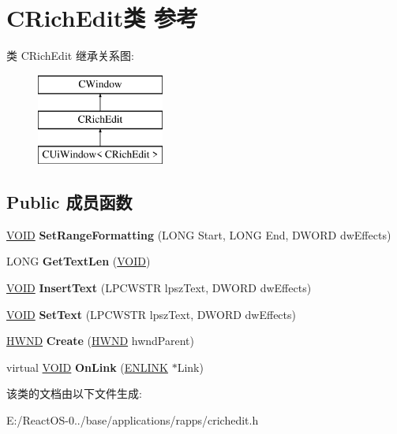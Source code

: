\hypertarget{class_c_rich_edit}{}\section{C\+Rich\+Edit类 参考}
\label{class_c_rich_edit}
类 C\+Rich\+Edit 继承关系图\+:\begin{figure}[H]
\begin{center}
\leavevmode
\includegraphics[height=3.000000cm]{class_c_rich_edit}
\end{center}
\end{figure}
\subsection*{Public 成员函数}
\begin{DoxyCompactItemize}
\item 
\mbox{\label{class_c_rich_edit_af2c594a76f5c8481ec339afa2b800c7c}} 
\hyperlink{interfacevoid}{V\+O\+ID} {\bfseries Set\+Range\+Formatting} (L\+O\+NG Start, L\+O\+NG End, D\+W\+O\+RD dw\+Effects)
\item 
\mbox{\label{class_c_rich_edit_a51ebb35332644a5d17b8f1415855b50b}} 
L\+O\+NG {\bfseries Get\+Text\+Len} (\hyperlink{interfacevoid}{V\+O\+ID})
\item 
\mbox{\label{class_c_rich_edit_ad73cb7354f953c31e63ad409e54b90bf}} 
\hyperlink{interfacevoid}{V\+O\+ID} {\bfseries Insert\+Text} (L\+P\+C\+W\+S\+TR lpsz\+Text, D\+W\+O\+RD dw\+Effects)
\item 
\mbox{\label{class_c_rich_edit_afa9e1a014ae86b61a00fd5e3c3162b8d}} 
\hyperlink{interfacevoid}{V\+O\+ID} {\bfseries Set\+Text} (L\+P\+C\+W\+S\+TR lpsz\+Text, D\+W\+O\+RD dw\+Effects)
\item 
\mbox{\label{class_c_rich_edit_aa7c04e2b4a3f94313a43da38326c8c56}} 
\hyperlink{interfacevoid}{H\+W\+ND} {\bfseries Create} (\hyperlink{interfacevoid}{H\+W\+ND} hwnd\+Parent)
\item 
\mbox{\label{class_c_rich_edit_a33022ef7685f775c39dcf25ee1142592}} 
virtual \hyperlink{interfacevoid}{V\+O\+ID} {\bfseries On\+Link} (\hyperlink{struct__enlink}{E\+N\+L\+I\+NK} $\ast$Link)
\end{DoxyCompactItemize}


该类的文档由以下文件生成\+:\begin{DoxyCompactItemize}
\item 
E\+:/\+React\+O\+S-\/0../base/applications/rapps/crichedit.\+h\end{DoxyCompactItemize}

